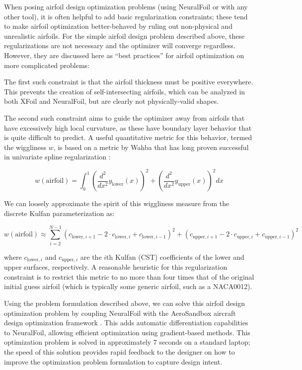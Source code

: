 \documentclass[conf]{new-aiaa}
\begin{document}
    When posing airfoil design optimization problems (using NeuralFoil or with any other tool), it is often helpful to add basic regularization constraints; these tend to make airfoil optimization better-behaved by ruling out non-physical and unrealistic airfoils. For the simple airfoil design problem described above, these regularizations are not necessary and the optimizer will converge regardless. However, they are discussed here as ``best practices'' for airfoil optimization on more complicated problems:

    The first such constraint is that the airfoil thickness must be positive everywhere. This prevents the creation of self-intersecting airfoils, which can be analyzed in both XFoil and NeuralFoil, but are clearly not physically-valid shapes.

    The second such constraint aims to guide the optimizer away from airfoils that have excessively high local curvature, as these have boundary layer behavior that is quite difficult to predict. A useful quantitative metric for this behavior, termed the wiggliness $w$, is based on a metric by Wahba that has long proven successful in univariate spline regularization \cite{wahba_spline_2007}:

    $$w(\mathrm{airfoil}) = \int_0^1 \left( \frac{d^2}{dx^2} y_\mathrm{lower}(x) \right)^2 + \left( \frac{d^2}{dx^2} y_\mathrm{upper}(x) \right)^2 dx$$

    \noindent We can loosely approximate the spirit of this wiggliness measure from the discrete Kulfan parameterization as:

    $$w(\mathrm{airfoil}) \approx \sum_{i=2}^{N-1} \left(c_{\mathrm{lower},i+1} - 2 \cdot c_{\mathrm{lower},i} + c_{\mathrm{lower},i-1} \right)^2 + \left(c_{\mathrm{upper},i+1} - 2 \cdot c_{\mathrm{upper},i} + c_{\mathrm{upper},i-1} \right)^2$$

    \noindent where $c_{\mathrm{lower},i}$ and $c_{\mathrm{upper},i}$ are the $i$th Kulfan (CST) coefficients of the lower and upper surfaces, respectively. A reasonable heuristic for this regularization constraint is to restrict this metric to no more than four times that of the original initial guess airfoil (which is typically some generic airfoil, such as a NACA0012).

    Using the problem formulation described above, we can solve this airfoil design optimization problem by coupling NeuralFoil with the AeroSandbox aircraft design optimization framework \cite{sharpe_aerosandbox_2021}. This adds automatic differentiation capabilities to NeuralFoil, allowing efficient optimization using gradient-based methods. This optimization problem is solved in approximately 7 seconds on a standard laptop; the speed of this solution provides rapid feedback to the designer on how to improve the optimization problem formulation to capture design intent.
\end{document}
